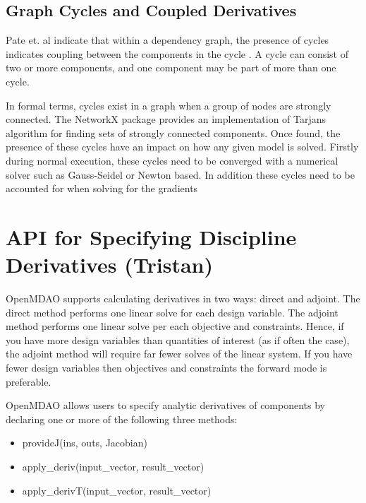 \documentclass[]{aiaa-tc} %
\begin{document}
    \subsection{Graph Cycles and Coupled Derivatives}

        Pate et. al indicate that within a dependency graph, the presence of cycles indicates coupling between
        the components in the cycle \cite{graph_problem2013}. A cycle can consist of two or more components, and
        one component may be part of more than one cycle.

        In formal terms, cycles exist in a graph when a group of nodes are strongly connected. The NetworkX package
        provides an implementation of Tarjans algorithm for finding sets of strongly connected
        components\cite{tarjan1972depth,nuutila1994finding}. Once found, the presence of these cycles
        have an impact on how any given model is solved. Firstly during normal execution, these cycles
        need to be converged with a numerical solver such as Gauss-Seidel or Newton based.
        In addition these cycles need to be accounted for when solving for the gradients


    \section{API for Specifying Discipline Derivatives (Tristan)}

        OpenMDAO supports calculating derivatives in two ways: direct and adjoint. The direct method performs
        one linear solve for each design variable. The adjoint method performs one linear solve per each objective
        and constraints. Hence, if you have more design variables than quantities of interest (as if often the case),
        the adjoint method will require far fewer solves of the linear system. If you have fewer design variables then
        objectives and constraints the forward mode is preferable.

        OpenMDAO allows users to specify analytic derivatives of components by declaring one or more of the following three
        methods:

        \begin{itemize}
            \item provideJ(ins, outs, Jacobian)
            \item apply\_deriv(input\_vector, result\_vector)
            \item apply\_derivT(input\_vector, result\_vector)
        \end{itemize}
\end{document}
